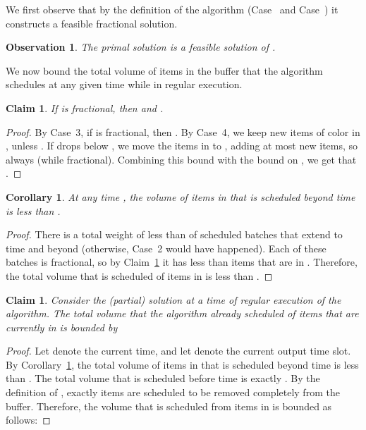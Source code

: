 \documentclass[12pt]{article}
\newtheorem{corollary}[theorem]{Corollary}
\newtheorem{claim}[theorem]{Claim}
\newtheorem{observation}[theorem]{Observation}
\begin{document}
We first observe that by the definition of the algorithm
(Case~ and Case~) it constructs a feasible fractional
solution.
\begin{observation}\label{obs: x feasible}
The primal solution  is a feasible solution of .
\end{observation}

We now bound the total volume of items in the buffer that 
the algorithm schedules at any given time while in regular
execution.

\begin{claim}\label{cl: B_c bound}
If  is fractional, then 
and .
\end{claim}

\begin{proof}
By Case~3, if  is fractional, then 
. By Case~4, we keep
new items of color  in , unless
. If 
drops below , we move the
items in  to , adding at
most  new items, so
 always
(while fractional).
Combining this bound with the bound on
, we get that 
.
\end{proof}

\begin{corollary}\label{cor: volume beyond t-1}
At any time , the volume of items in  
that is scheduled beyond time  is less than 
.
\end{corollary}

\begin{proof}
There is a total weight of less than  of scheduled batches 
that extend to time  and beyond (otherwise, 
Case~2 would have happened). Each of these batches is fractional,
so by Claim~\ref{cl: B_c bound} it has less than  
items that are in . Therefore, the total volume
that is scheduled of items in  is less than
.
\end{proof}

\begin{claim}\label{cl: scheduled volume}
Consider the (partial) solution  at a time of regular 
execution of  the algorithm.
The total volume that the algorithm already scheduled
of items that are currently in  is bounded by

\end {claim}

\begin{proof}
Let  denote the current time, and let  denote
the current output time slot. By Corollary~\ref{cor: volume beyond t-1},
the total volume of items in  that is scheduled beyond time 
is less than . The total volume that is  
scheduled before time  is exactly . By the definition
of , exactly  items are scheduled to be removed completely 
from the buffer. Therefore, the volume that is scheduled from items in 
is bounded as follows:


\end{proof}
\end{document}
